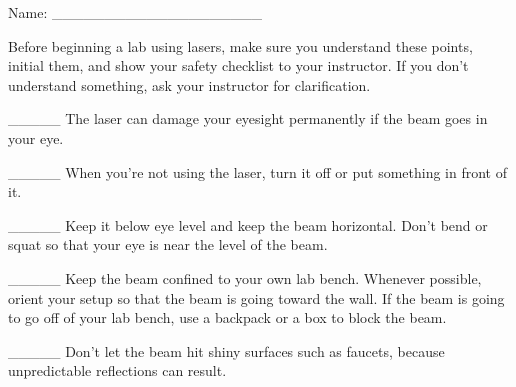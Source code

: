 

Name: \_\_\_\_\_\_\_\_\_\_\_\_\_\_\_\_\_\_\_\_

Before beginning a lab using lasers, make sure you
understand these points, initial them, and show your safety
checklist to your instructor. If you don't understand
something, ask your instructor for clarification.

\_\_\_\_\_ The laser can damage your eyesight permanently if the
beam goes in your eye.

\_\_\_\_\_ When you're not using the laser, turn it off
 or put something in front of it.

\_\_\_\_\_ Keep it below eye level and keep the beam horizontal.
Don't bend or squat so that your eye is near the level of the beam.

\_\_\_\_\_ Keep the beam confined to your own lab bench. Whenever
possible, orient your setup so that the beam is going toward the
wall. If the beam is going to go off of your lab bench, use a backpack
or a box to block the beam.

\_\_\_\_\_ Don't let the beam hit shiny surfaces such as faucets, because
unpredictable reflections can result.
